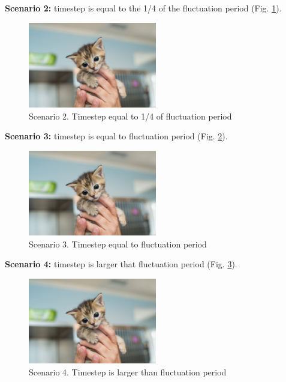 \textbf{Scenario 2:} timestep is equal to the  1/4 of the fluctuation period (Fig. \ref{time2}).

\begin{figure}[h!]
\centering %
\includegraphics[width=0.5\textwidth]{Pictures/kitten-placeholder.jpg}
\caption{Scenario 2. Timestep equal to 1/4 of fluctuation period}
\label{time2}
\end{figure}

\textbf{Scenario 3:} timestep is equal to fluctuation period (Fig. \ref{time3}).

\begin{figure}[h!]
\centering %
\includegraphics[width=0.5\textwidth]{Pictures/kitten-placeholder.jpg}
\caption{Scenario 3. Timestep equal to fluctuation period}
\label{time3}
\end{figure}

\textbf{Scenario 4:} timestep is larger that fluctuation period (Fig. \ref{time4}).

\begin{figure}[h!]
\centering %
\includegraphics[width=0.5\textwidth]{Pictures/kitten-placeholder.jpg}
\caption{Scenario 4. Timestep is larger than fluctuation period}
\label{time4}
\end{figure}

